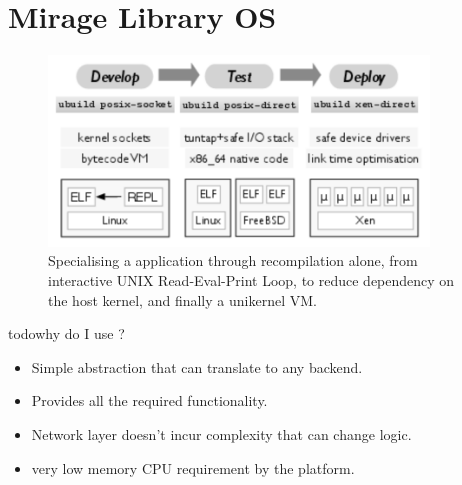 \section{Mirage Library OS} \label{sec:mirage-intro}

\begin{figure}
\includegraphics[width=0.9\textwidth]{mirage-toolchain}
\caption{Specialising a \mirage application through recompilation alone, from
  interactive UNIX Read-Eval-Print Loop, to reduce dependency on the host
  kernel, and finally a unikernel VM.}
\label{fig:mirage-toolchain}
\end{figure}



todo{why do I use \mirage?}
\begin{itemize}
  \item Simple abstraction that can translate to any backend.
  \item Provides all the required functionality.
  \item Network layer doesn't incur complexity that can change logic.
  \item very low memory CPU requirement by the platform. 
\end{itemize}

